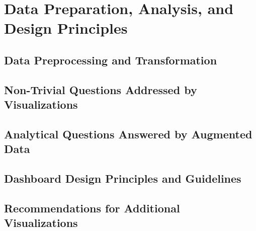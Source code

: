 \chapter{Data Preparation, Analysis, and Design Principles}
\section{Data Preprocessing and Transformation}
\section{Non-Trivial Questions Addressed by Visualizations}
\section{Analytical Questions Answered by Augmented Data}
\section{Dashboard Design Principles and Guidelines}
\section{Recommendations for Additional Visualizations}